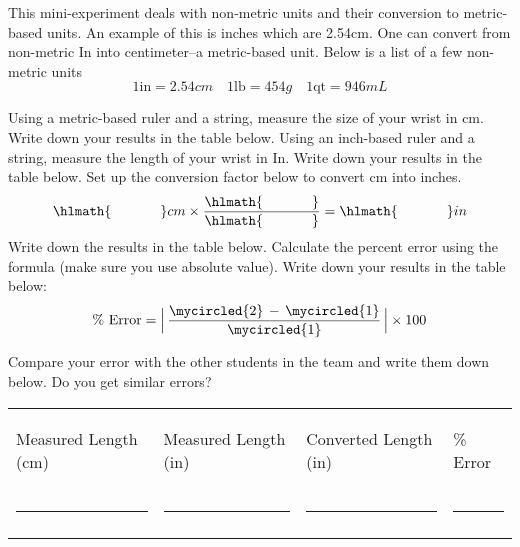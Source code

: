 \documentclass[main.tex]{subfiles}
\begin{document}
 
\vspace{0.2cm}{\large \bfseries 4. Non-metric conversions}
This mini-experiment deals with non-metric units and their conversion to metric-based units. An example of this is inches which are 2.54cm. One can convert from non-metric In into centimeter--a  metric-based unit. Below is a list of a few non-metric units
\begin{equation*}
\boxed{   1\text{in}=2.54cm \enspace \text{}  \enspace 1\text{lb}=454g\enspace \text{}  \enspace 1\text{qt}=946mL}   
\end{equation*}
\begin{steps}
    \newstep[] Using a metric-based ruler and a string, measure the size of your wrist in cm. Write down your results in the table below.
    \newstep[] Using an inch-based ruler and a string, measure the length of your wrist in In. Write down your results in the table below.
        \newstep[]  Set up the conversion factor below to convert cm into inches.
\[\hlmath{\hspace{35pt }}cm\times\dfrac{\hlmath{\hspace{35pt }}}{\hlmath{\hspace{35pt }}}=\hlmath{\hspace{35pt }}in\]
        \newstep[]  Write down the results in the table below.
        \newstep[]  Calculate the percent error using the formula (make sure you use absolute value). Write down your results in the table below:
        \[  \text{\% Error}= \Big \lvert \, \frac{\centering\mycircled{2} \, - \, \mycircled{1} }{\centering\mycircled{1}}\,	\Big \lvert \times 100\]
 

         \newstep[] Compare your error with the other students in the team and write them down below. Do you get similar errors?    
         
\begin{center}\resizebox{18cm}{!} {

 \begin{tabular}{ p{4cm} p{4cm} p{4cm}p{3cm}   }
   \begin{bf}Measured Length (cm)\end{bf} & \begin{bf}Measured Length (in)\end{bf} &\begin{bf}Converted Length (in)\end{bf} &\begin{bf} \% Error\end{bf} \\[0.1cm]     
  \rule{3cm}{0.4pt} 				&\rule{3cm}{0.4pt}&\rule{3cm}{0.4pt}&\rule{3cm}{0.4pt}  \\[0.3cm]
     				& \centering\mycircled{1}&\centering\mycircled{2} &   \\[0.3cm]           
          
 \end{tabular}}\end{center}
\end{steps}
\end{document}
